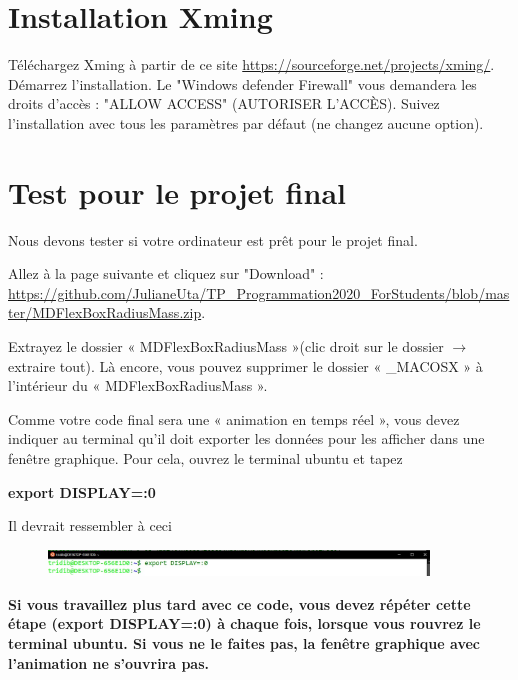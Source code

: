 \documentclass{article}
\begin{document}
\section{Installation Xming}
Téléchargez Xming à partir de ce site \href{https://sourceforge.net/projects/xming/}{https://sourceforge.net/projects/xming/}. Démarrez l'installation. Le "Windows defender Firewall" vous demandera les droits d'accès : "ALLOW ACCESS" (AUTORISER L'ACCÈS). Suivez l'installation avec tous les paramètres par défaut (ne changez aucune option).

\section{Test pour le projet final}
Nous devons tester si votre ordinateur est prêt pour le projet final.

Allez à la page suivante et cliquez sur "Download" : \\ \href{https://github.com/JulianeUta/TP_Programmation2020_ForStudents/blob/master/MDFlexBoxRadiusMass.zip}{https://github.com/JulianeUta/TP\_Programmation2020\_ForStudents/blob/master/MDFlexBoxRadiusMass.zip}.

Extrayez le dossier « MDFlexBoxRadiusMass »(clic droit sur le dossier $\rightarrow$ extraire tout). Là encore, vous pouvez supprimer le dossier « \_MACOSX » à l'intérieur du « MDFlexBoxRadiusMass ».

Comme votre code final sera une « animation en temps réel », vous devez indiquer au terminal qu'il doit exporter les données pour les afficher dans une fenêtre graphique. Pour cela, ouvrez le terminal ubuntu et tapez 
\begin{tcolorbox}[width=\textwidth,colframe=BurntOrange,colback={black},title={ubuntu terminal},outer arc=0mm,colupper=white]  
    \large\textbf{  export DISPLAY=:0 }
\end{tcolorbox}
Il devrait ressembler à ceci
\begin{figure}[H]
\center
\includegraphics[width=0.9\textwidth]{Plots/MD_1EXPORT.jpeg}
\end{figure}
{\color{Bittersweet}\textbf{Si vous travaillez plus tard avec ce code, vous devez répéter cette étape (export DISPLAY=:0) à chaque fois, lorsque vous rouvrez le terminal ubuntu. Si vous ne le faites pas, la fenêtre graphique avec l'animation ne s'ouvrira pas.}}
\end{document}
